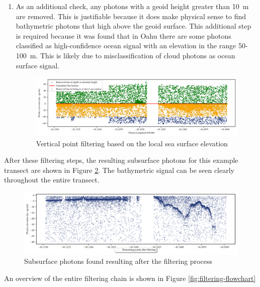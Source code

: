 \begin{enumerate}
    The results of steps 2-4 are shown in Figure \ref{fig:vert_filtering}
    
    \item As an additional check, any photons with a geoid height greater than 10~m are removed. This is justifiable because it does make physical sense to find bathymetric photons that high above the geoid surface. This additional step is required because it was found that in Oahu there are some photons classified as high-confidence ocean signal with an elevation in the range 50-100~m. This is likely due to misclassification of cloud photons as ocean surface signal.
    
    
    \begin{figure}[htb]
        \centering
        \includegraphics[width=\textwidth]{figures/methodology_sealvl_filtering.pdf}
        \caption{Vertical point filtering based on the local sea surface elevation}
        \label{fig:vert_filtering}
    \end{figure}
\end{enumerate}

After these filtering steps, the resulting subsurface photons for this example transect are shown in Figure \ref{fig:remaing_photons}. The bathymetric signal can be seen clearly throughout the entire transect.

\begin{figure}[htb]
    \centering
    \includegraphics[width=\textwidth]{figures/methodology_reminaing_after_filtering.pdf}
    \caption{Subsurface photons found resulting after the filtering process}
    \label{fig:remaing_photons}
\end{figure}

An overview of the entire filtering chain is shown in Figure \ref{fig:filtering-flowchart} 

